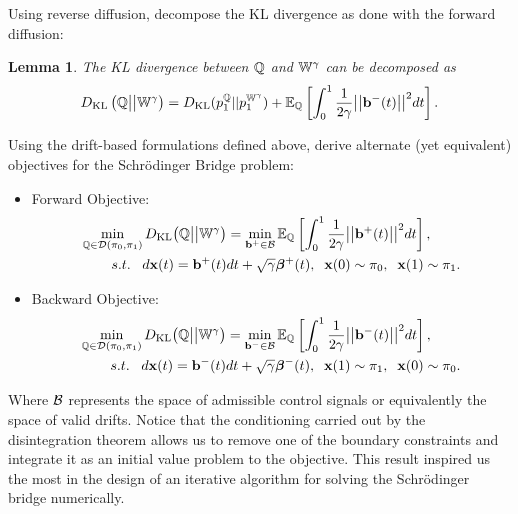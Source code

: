 \documentclass[a4paper,12pt,twoside,openright]{report}
\newtheorem{lemma}{Lemma}
\theoremstyle{definition}
\begin{document}
Using reverse diffusion, \cite{pavon1991free} decompose the KL divergence as done with the forward diffusion:
\begin{lemma}\label{lemma:control}\citep{pavon1991free}
    The KL divergence between ${\mathbb{Q}}$ and $\mathbb{W}^{\gamma}$ can be decomposed as
\begin{align}\label{eq:free_energy_2}
     D_{\mathrm{KL}}\left({\mathbb{Q}} \big|\big| \mathbb{W}^{\gamma}\right) = D_{\mathrm{KL}}(p^{{\mathbb{Q}}}_1 || p_1^{ \mathbb{W}^{\gamma}}) + \mathbb{E}_{\mathbb{Q}}\left[\int_0^1\frac{1}{2\gamma} \big|\big|{\mathbf{b}}^{-}(t)\big|\big|^2 dt\right].
\end{align}
\end{lemma}
Using the drift-based formulations defined above, \cite{pavon1991free} derive alternate (yet equivalent) objectives for the Schrödinger Bridge problem:

\begin{itemize}
\item Forward Objective: 
\begin{align} \label{eq:controlled_bridge_forward}
    \min_{{\mathbb{Q}} \in {\mathcal{D}}(\pi_0, \pi_1)} D_{\mathrm{KL}}\big({\mathbb{Q}} \big|\big| \mathbb{W}^{\gamma}\big)& = \min_{{\mathbf{b}}^{+} \in {\mathcal{B}} }  \mathbb{E}_{\mathbb{Q}}\left[\int_0^1 \frac{1}{2\gamma}\big|\big|{\mathbf{b}}^{+}(t) \big|\big|^2 dt\right], \nonumber \\
    s.t.\;\;\; d{\mathbf{x}}(t) = {\mathbf{b}}^{+}(t) &dt + \sqrt{\gamma} {\bm{\beta}}^{+}(t), \;\; {\mathbf{x}}(0) \sim \pi_0, \;\; {\mathbf{x}}(1) \sim \pi_1.
\end{align}
\item Backward Objective:
\begin{align} \label{eq:controlled_bridge_backward}
    \min_{{\mathbb{Q}} \in {\mathcal{D}}(\pi_0, \pi_1)} D_{\mathrm{KL}}\big({\mathbb{Q}} \big|\big| \mathbb{W}^{\gamma}\big)& = \min_{{\mathbf{b}}^{-} \in {\mathcal{B}} }  \mathbb{E}_{\mathbb{Q}}\left[\int_0^1 \frac{1}{2\gamma}\big|\big|{\mathbf{b}}^{-}(t) \big|\big|^2 dt\right], \nonumber \\
    s.t.\;\;\; d{\mathbf{x}}(t) = {\mathbf{b}}^{-}(t) &dt + \sqrt{\gamma} {\bm{\beta}}^{-}(t), \;\; {\mathbf{x}}(1) \sim \pi_1 , \;\; {\mathbf{x}}(0) \sim \pi_0.
\end{align}
\end{itemize}
Where ${\mathcal{B}}$ represents the space of admissible control signals or equivalently the space of valid drifts. Notice that the conditioning carried out by the disintegration theorem allows us to remove one of the boundary constraints and integrate it as an initial value problem to the objective. This result inspired us the most in the design of an iterative algorithm for solving the Schrödinger bridge numerically. 
\end{document}
